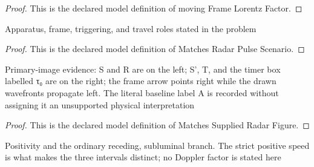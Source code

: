 \begin{proof}
  This is the declared model definition of moving Frame Lorentz Factor.
\end{proof}
\begin{definition}
  \label{def:physics:phyx-mini-0593:phyxminiproblems-problemphyxmini0593-matchesradarpulsescenario}
  Apparatus, frame, triggering, and travel roles stated in the problem
\end{definition}
\begin{proof}
  This is the declared model definition of Matches Radar Pulse Scenario.
\end{proof}
\begin{definition}
  \label{def:physics:phyx-mini-0593:phyxminiproblems-problemphyxmini0593-matchessuppliedradarfigure}
  Primary-image evidence: S and R are on the left; S', T, and the timer box labelled τ₀ are on the right; the frame arrow points right while the drawn wavefronts propagate left. The literal baseline label A is recorded without assigning it an unsupported physical interpretation
\end{definition}
\begin{proof}
  This is the declared model definition of Matches Supplied Radar Figure.
\end{proof}
\begin{definition}
  \label{def:physics:phyx-mini-0593:phyxminiproblems-problemphyxmini0593-hasphysicalradarparameters}
  Positivity and the ordinary receding, subluminal branch. The strict positive speed is what makes the three intervals distinct; no Doppler factor is stated here
\end{definition}
